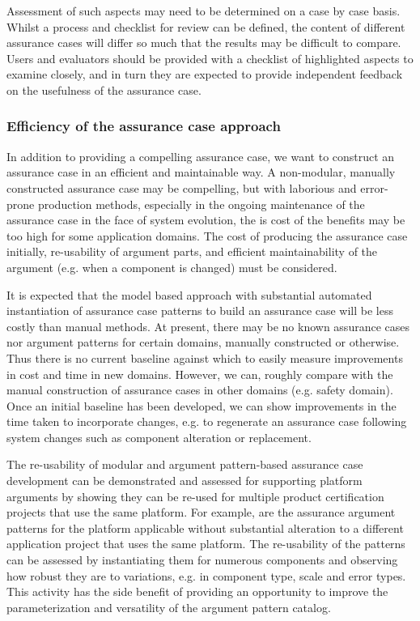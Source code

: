 \documentclass[12pt,twoside,a4paper]{article}
\begin{document}
Assessment of such aspects may need to be determined on a case by case basis. Whilst a process and checklist for review can be defined, the content of different assurance cases will differ so much that the results may be difficult to compare. Users and evaluators should be provided with a checklist of highlighted aspects to examine closely, and in turn they are expected to provide independent feedback on the usefulness of the assurance case.

\subsubsection{Efficiency of the assurance case approach}

In addition to providing a compelling assurance case, we want to construct an assurance case in an efficient and maintainable way. A non-modular, manually constructed assurance case may be compelling, but with laborious and error-prone production methods, especially in the ongoing maintenance of the assurance case in the face of system evolution, the is cost of the benefits may be too high for some application domains. The cost of producing the assurance case initially, re-usability of argument parts, and efficient maintainability of the argument (e.g. when a component is changed) must be considered. 

It is expected that the model based approach with substantial automated instantiation of assurance case patterns to build an assurance case will be less costly than manual methods.
At present, there may be no known assurance cases nor argument patterns for certain domains, manually constructed or otherwise. Thus there is no current baseline against which to easily measure improvements in cost and time in new domains. However, we can, roughly compare with the manual construction of assurance cases in other domains (e.g. safety domain). Once an initial baseline has been developed, we can show improvements in the time taken to incorporate changes, e.g. to regenerate an assurance case following system changes such as component alteration or replacement. 

The re-usability of modular and argument pattern-based assurance case development can be demonstrated and assessed for supporting platform arguments by showing they can be re-used for multiple product certification projects that use the same platform. For example, are the assurance argument patterns for the platform applicable without substantial alteration to a different application project that uses the same platform. The re-usability of the patterns can be assessed by instantiating them for numerous components and observing how robust they are to variations, e.g. in component type, scale and error types. This activity has the side benefit of providing an opportunity to improve the parameterization and versatility of the argument pattern catalog.
\end{document}
